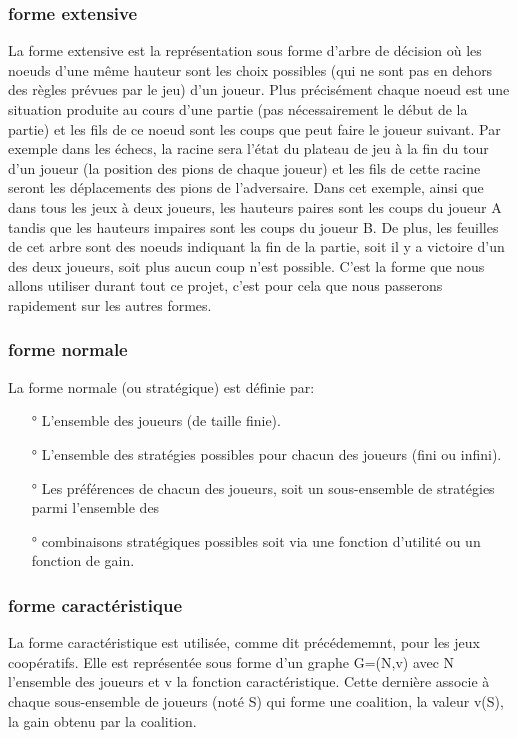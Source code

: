\documentclass[12pt]{article}
\begin{document}
	\subsubsection{forme extensive}
    	La forme extensive est la représentation sous forme d'arbre de décision où les noeuds d'une même hauteur sont les choix possibles (qui ne sont pas en dehors des règles prévues par le jeu) d'un joueur. Plus précisément chaque noeud est une situation produite au cours d'une partie (pas nécessairement le début de la partie) et les fils de ce noeud sont les coups que peut faire le joueur suivant. Par exemple dans les échecs, la racine sera l'état du plateau de jeu à la fin du tour d'un joueur (la position des pions de chaque joueur) et les fils de cette racine seront les déplacements des pions de l'adversaire. Dans cet exemple, ainsi que dans tous les jeux à deux joueurs, les hauteurs paires sont les coups du joueur A tandis que les hauteurs impaires sont les coups du joueur B. De plus, les feuilles de cet arbre sont des noeuds indiquant la fin de la partie, soit il y a victoire d'un des deux joueurs, soit plus aucun coup n'est possible.
    	C'est la forme que nous allons utiliser durant tout ce projet, c'est pour cela que nous passerons rapidement sur les autres formes.

	\subsubsection{forme normale}
    	La forme normale (ou stratégique) est définie par:
    	\begin{itemize}
    		\item[°] L'ensemble des joueurs (de taille finie).
    		\item[°] L'ensemble des stratégies possibles pour chacun des joueurs (fini ou infini).
    		\item[°] Les préférences de chacun des joueurs, soit un sous-ensemble de stratégies parmi l'ensemble des
    		\item[°] combinaisons stratégiques possibles soit via une fonction d'utilité ou un fonction de gain.
    	\end{itemize}

	\subsubsection{forme caractéristique}
    	La forme caractéristique est utilisée, comme dit précédememnt, pour les jeux coopératifs. Elle est représentée sous forme d'un graphe G=(N,v) avec N l'ensemble des joueurs et v la fonction caractéristique. Cette dernière associe à chaque sous-ensemble de joueurs (noté S) qui forme une coalition, la valeur v(S), la gain obtenu par la coalition.
\end{document}
